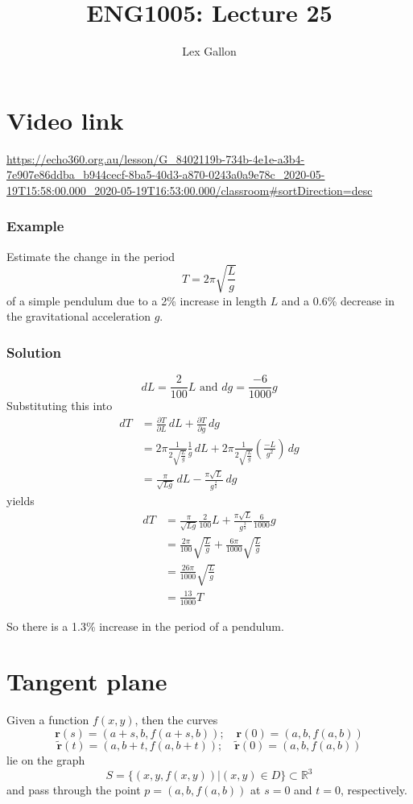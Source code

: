 \documentclass[11pt]{article}
\newcommand{\reals}{\mathbb{R}}
\renewcommand{\vec}[1]{\mathbf{#1}}
\begin{document}
\title{ENG1005: Lecture 25}
\author{Lex Gallon}
\maketitle

\tableofcontents

\section*{Video link}
\url{https://echo360.org.au/lesson/G_8402119b-734b-4e1e-a3b4-7e907e86ddba_b944cecf-8ba5-40d3-a870-0243a0a9e78c_2020-05-19T15:58:00.000_2020-05-19T16:53:00.000/classroom#sortDirection=desc}

\subsubsection{Example}
Estimate the change in the period
\[ T = 2\pi \sqrt{\frac{L}{g}} \]
of a simple pendulum due to a 2\% increase in length $L$ and a 0.6\% decrease in the gravitational acceleration $g$.

\subsubsection{Solution}
\[ dL = \frac{2}{100}L \text{ and } dg = \frac{-6}{1000}g \]
Substituting this into
\begin{align*}
dT &= \frac{\partial T}{\partial L}\, dL + \frac{\partial T}{\partial g}\, dg \\
&= 2\pi \frac{1}{2 \sqrt{\frac{L}{g}}} \frac{1}{g}\, dL + 2\pi \frac{1}{2 \sqrt{\frac{L}{g}}} \left( \frac{-L}{g^2} \right)\, dg \\
&= \frac{\pi}{\sqrt{Lg}}\, dL - \frac{\pi \sqrt{L}}{g^{\frac{3}{2}}}\, dg 
\end{align*}
yields
\begin{align*}
dT &= \frac{\pi}{\sqrt{Lg}} \frac{2}{100}L + \frac{\pi \sqrt{L}}{g^{\frac{3}{2}}} \frac{6}{1000}g \\
&= \frac{2\pi}{100} \sqrt{\frac{L}{g}} + \frac{6 \pi}{1000} \sqrt{\frac{L}{g}} \\
&=  \frac{26\pi}{1000} \sqrt{\frac{L}{g}} \\
&= \frac{13}{1000} T
\end{align*}

So there is a 1.3\% increase in the period of a pendulum.

\section{Tangent plane}
Given a function $f(x,y)$, then the curves
\[ \vec{r}(s) = (a+s, b, f(a+s, b));\quad \vec{r}(0) = (a, b, f(a, b)) \]
\[ \vec{\tilde{r}}(t) = (a, b + t, f(a, b+t));\quad \vec{\tilde{r}}(0) = (a, b, f(a, b)) \]
lie on the graph
\[ S = \{ (x, y, f(x, y)) | (x, y) \in D \} \subset \reals^3 \]
and pass through the point $p = (a, b, f(a,b))$ at $s=0$ and $t=0$, respectively.
\end{document}
